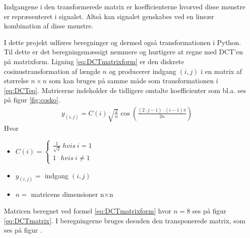 Indgangene i den transformerede matrix er koefficienterne hvorved disse mønstre er repræsenteret i signalet. Altså kan signalet genskabes ved en lineær kombination af disse mønstre.

I dette projekt udføres beregninger og dermed også transformationen i Python. Til dette er det beregningsmæssigt nemmere og hurtigere at regne med DCT'en på matrixform. Ligning \ref{eq:DCTmatrixform} er den diskrete cosinustransformation af længde $n$ og producerer indgang $(i,j)$ i en matrix af størrelse $n \times n$ som kan bruges på samme måde som transformationen i \vref{eq:DCTeq}. Matricerne indeholder de tidligere omtalte koefficienter som bl.a. ses på figur \ref{fig:cosko}.
\begin{align}
	y_{(i,j)} = C(i) \sqrt{\frac{2}{n}} \cos\left(\frac{(2 \cdot j-1) \cdot (i-1)\pi}{2n}\right)
\label{eq:DCTmatrixform}
\end{align}
Hvor
\begin{itemize}
		\item{$C(i)= \begin{cases}
			\frac{1}{\sqrt{2}} \ hvis \ i = 1\\
			1\ \ \ hvis \ i \neq 1
		\end{cases}
		$}
		\item{$y_{(i,j)}=$ indgang $(i,j)$}
		\item{$n =$ matricens dimensioner n$\times$n}
\end{itemize}
Matricen beregnet ved formel \vref{eq:DCTmatrixform} hvor $n=8$ ses på figur \ref{eq:DCTmatrix}. I beregningerne bruges desuden den transponerede matrix, som ses på figur .

